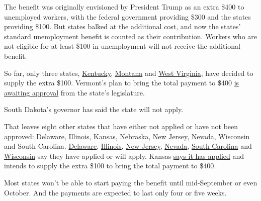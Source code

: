 The benefit was originally envisioned by President Trump as an extra
\$400 to unemployed workers, with the federal government providing \$300
and the states providing \$100. But states balked at the additional
cost, and now the states' standard unemployment benefit is counted as
their contribution. Workers who are not eligible for at least \$100 in
unemployment will not receive the additional benefit.

So far, only three states,
\href{https://www.courier-journal.com/story/news/local/2020/08/21/kentucky-unemployment-benefits-feds-approve-400-weekly-boost/3407444001/}{Kentucky},
\href{https://apnews.com/c74b1d3f46341434e61f19b4c824aaf2}{Montana} and
\href{https://wvmetronews.com/2020/08/28/w-va-approved-for-federal-enhanced-unemployment-benefit-but-questions-arise-over-how-far-that-goes/}{West
Virginia}, have decided to supply the extra \$100. Vermont's plan to
bring the total payment to \$400
\href{https://labor.vermont.gov/press-release/press-release-vermont-secures-federal-funding-increased-unemployment-benefits-through}{is
awaiting approval} from the state's legislature.

South Dakota's governor has said the state will not apply.

That leaves eight other states that have either not applied or have not
been approved: Delaware, Illinois, Kansas, Nebraska, New Jersey, Nevada,
Wisconsin and South Carolina.
\href{https://news.delaware.gov/2020/08/21/137968/}{Delaware},
\href{https://www.chicagotribune.com/coronavirus/ct-coronavirus-illinois-extra-300-weekly-unemployment-benefits-20200826-jkcrsirtlbbjthck6yzs3tzqwu-story.html}{Illinois},
\href{https://www.njherald.com/news/20200826/nj-applying-for-extra-300-week-in-federal-covid-19-unemployment-benefits}{New
Jersey},
\href{https://lasvegassun.com/news/2020/aug/25/nevada-to-seek-300-weekly-jobless-aid-wont-add-100/}{Nevada},
\href{https://www.wistv.com/2020/08/26/sc-employment-officials-apply-grant-that-could-provide-extra-unemployed/}{South
Carolina} and \href{https://dwd.wisconsin.gov/uiben/lwa/}{Wisconsin} say
they have applied or will apply. Kansas
\href{https://www.kshb.com/news/coronavirus/kansas-applies-for-program-to-bring-400-in-weekly-assistance-to-unemployed-residents}{says
it has applied} and intends to supply the extra \$100 to bring the total
payment to \$400.

Most states won't be able to start paying the benefit until
mid-September or even October. And the payments are expected to last
only four or five weeks.


